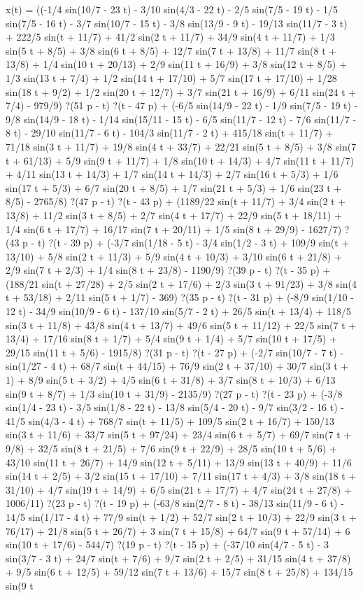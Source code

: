 x(t) = ((-1/4 sin(10/7 - 23 t) - 3/10 sin(4/3 - 22 t) - 2/5 sin(7/5 - 19 t) - 1/5 sin(7/5 - 16 t) - 3/7 sin(10/7 - 15 t) - 3/8 sin(13/9 - 9 t) - 19/13 sin(11/7 - 3 t) + 222/5 sin(t + 11/7) + 41/2 sin(2 t + 11/7) + 34/9 sin(4 t + 11/7) + 1/3 sin(5 t + 8/5) + 3/8 sin(6 t + 8/5) + 12/7 sin(7 t + 13/8) + 11/7 sin(8 t + 13/8) + 1/4 sin(10 t + 20/13) + 2/9 sin(11 t + 16/9) + 3/8 sin(12 t + 8/5) + 1/3 sin(13 t + 7/4) + 1/2 sin(14 t + 17/10) + 5/7 sin(17 t + 17/10) + 1/28 sin(18 t + 9/2) + 1/2 sin(20 t + 12/7) + 3/7 sin(21 t + 16/9) + 6/11 sin(24 t + 7/4) - 979/9) ?(51 p - t) ?(t - 47 p) + (-6/5 sin(14/9 - 22 t) - 1/9 sin(7/5 - 19 t) - 9/8 sin(14/9 - 18 t) - 1/14 sin(15/11 - 15 t) - 6/5 sin(11/7 - 12 t) - 7/6 sin(11/7 - 8 t) - 29/10 sin(11/7 - 6 t) - 104/3 sin(11/7 - 2 t) + 415/18 sin(t + 11/7) + 71/18 sin(3 t + 11/7) + 19/8 sin(4 t + 33/7) + 22/21 sin(5 t + 8/5) + 3/8 sin(7 t + 61/13) + 5/9 sin(9 t + 11/7) + 1/8 sin(10 t + 14/3) + 4/7 sin(11 t + 11/7) + 4/11 sin(13 t + 14/3) + 1/7 sin(14 t + 14/3) + 2/7 sin(16 t + 5/3) + 1/6 sin(17 t + 5/3) + 6/7 sin(20 t + 8/5) + 1/7 sin(21 t + 5/3) + 1/6 sin(23 t + 8/5) - 2765/8) ?(47 p - t) ?(t - 43 p) + (1189/22 sin(t + 11/7) + 3/4 sin(2 t + 13/8) + 11/2 sin(3 t + 8/5) + 2/7 sin(4 t + 17/7) + 22/9 sin(5 t + 18/11) + 1/4 sin(6 t + 17/7) + 16/17 sin(7 t + 20/11) + 1/5 sin(8 t + 29/9) - 1627/7) ?(43 p - t) ?(t - 39 p) + (-3/7 sin(1/18 - 5 t) - 3/4 sin(1/2 - 3 t) + 109/9 sin(t + 13/10) + 5/8 sin(2 t + 11/3) + 5/9 sin(4 t + 10/3) + 3/10 sin(6 t + 21/8) + 2/9 sin(7 t + 2/3) + 1/4 sin(8 t + 23/8) - 1190/9) ?(39 p - t) ?(t - 35 p) + (188/21 sin(t + 27/28) + 2/5 sin(2 t + 17/6) + 2/3 sin(3 t + 91/23) + 3/8 sin(4 t + 53/18) + 2/11 sin(5 t + 1/7) - 369) ?(35 p - t) ?(t - 31 p) + (-8/9 sin(1/10 - 12 t) - 34/9 sin(10/9 - 6 t) - 137/10 sin(5/7 - 2 t) + 26/5 sin(t + 13/4) + 118/5 sin(3 t + 11/8) + 43/8 sin(4 t + 13/7) + 49/6 sin(5 t + 11/12) + 22/5 sin(7 t + 13/4) + 17/16 sin(8 t + 1/7) + 5/4 sin(9 t + 1/4) + 5/7 sin(10 t + 17/5) + 29/15 sin(11 t + 5/6) - 1915/8) ?(31 p - t) ?(t - 27 p) + (-2/7 sin(10/7 - 7 t) - sin(1/27 - 4 t) + 68/7 sin(t + 44/15) + 76/9 sin(2 t + 37/10) + 30/7 sin(3 t + 1) + 8/9 sin(5 t + 3/2) + 4/5 sin(6 t + 31/8) + 3/7 sin(8 t + 10/3) + 6/13 sin(9 t + 8/7) + 1/3 sin(10 t + 31/9) - 2135/9) ?(27 p - t) ?(t - 23 p) + (-3/8 sin(1/4 - 23 t) - 3/5 sin(1/8 - 22 t) - 13/8 sin(5/4 - 20 t) - 9/7 sin(3/2 - 16 t) - 41/5 sin(4/3 - 4 t) + 768/7 sin(t + 11/5) + 109/5 sin(2 t + 16/7) + 150/13 sin(3 t + 11/6) + 33/7 sin(5 t + 97/24) + 23/4 sin(6 t + 5/7) + 69/7 sin(7 t + 9/8) + 32/5 sin(8 t + 21/5) + 7/6 sin(9 t + 22/9) + 28/5 sin(10 t + 5/6) + 43/10 sin(11 t + 26/7) + 14/9 sin(12 t + 5/11) + 13/9 sin(13 t + 40/9) + 11/6 sin(14 t + 2/5) + 3/2 sin(15 t + 17/10) + 7/11 sin(17 t + 4/3) + 3/8 sin(18 t + 31/10) + 4/7 sin(19 t + 14/9) + 6/5 sin(21 t + 17/7) + 4/7 sin(24 t + 27/8) + 1006/11) ?(23 p - t) ?(t - 19 p) + (-63/8 sin(2/7 - 8 t) - 38/13 sin(11/9 - 6 t) - 14/5 sin(1/17 - 4 t) + 77/9 sin(t + 1/2) + 52/7 sin(2 t + 10/3) + 22/9 sin(3 t + 76/17) + 21/8 sin(5 t + 26/7) + 3 sin(7 t + 15/8) + 64/7 sin(9 t + 57/14) + 6 sin(10 t + 17/6) - 544/7) ?(19 p - t) ?(t - 15 p) + (-37/10 sin(4/7 - 5 t) - 3 sin(3/7 - 3 t) + 24/7 sin(t + 7/6) + 9/7 sin(2 t + 2/5) + 31/15 sin(4 t + 37/8) + 9/5 sin(6 t + 12/5) + 59/12 sin(7 t + 13/6) + 15/7 sin(8 t + 25/8) + 134/15 sin(9 t 